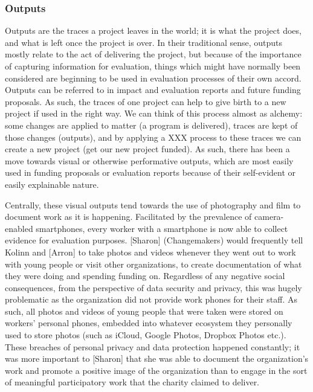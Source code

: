 \subsubsection{Outputs}
Outputs are the traces a project leaves in the world; it is what the project does, and what is left once the project is over. In their traditional sense, outputs mostly relate to the act of delivering the project, but because of the importance of capturing information for evaluation, things which might have normally been considered are beginning to be used in evaluation processes of their own accord. Outputs can be referred to in impact and evaluation reports and future funding proposals. As such, the traces of one project can help to give birth to a new project if used in the right way. We can think of this process almost as alchemy: some changes are applied to matter (a program is delivered), traces are kept of those changes (outputs), and by applying a XXX process to these traces we can create a new project (get our new project funded). As such, there has been a move towards visual or otherwise performative outputs, which are most easily used in funding proposals or evaluation reports because of their self-evident or easily explainable nature.

Centrally, these visual outputs tend towards the use of photography and film to document work as it is happening. Facilitated by the prevalence of camera-enabled smartphones, every worker with a smartphone is now able to collect evidence for evaluation purposes. [Sharon] (Changemakers) would frequently tell Kolinn and [Arron] to take photos and videos whenever they went out to work with young people or visit other organizations, to create documentation of what they were doing and spending funding on. Regardless of any negative social consequences, from the perspective of data security and privacy, this was hugely problematic as the organization did not provide work phones for their staff. As such, all photos and videos of young people that were taken were stored on workers' personal phones, embedded into whatever ecosystem they personally used to store photos (such as iCloud, Google Photos, Dropbox Photos etc.). These breaches of personal privacy and data protection happened constantly; it was more important to [Sharon] that she was able to document the organization's work and promote a positive image of the organization than to engage in the sort of meaningful participatory work that the charity claimed to deliver.


